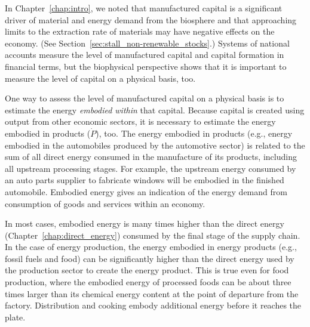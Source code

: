 

In Chapter~\ref{chap:intro}, we noted that 
manufactured capital is a significant driver 
of material and energy demand from the biosphere
and that approaching limits 
to the extraction rate of materials may have negative
effects on the economy.
(See Section~\ref{sec:stall_non-renewable_stocks}.)
Systems of national accounts measure the level
of manufactured capital and capital formation in financial terms,
but the biophysical perspective shows that
it is important to measure the level of capital 
on a physical basis, too.

One way to assess the level of manufactured capital on a physical basis
is to estimate the energy \emph{embodied within} that capital.
Because capital is created using output from other economic sectors, 
it is necessary to estimate the energy embodied in products ($\dot{P}$), too.
The energy embodied in products 
(e.g., energy embodied in the automobiles produced by the automotive sector)
is related to the sum of all direct energy
consumed in the manufacture of its products, 
including all upstream processing stages. 
For example, the upstream energy consumed by an auto parts supplier
to fabricate windows will be embodied in the finished automobile.
Embodied energy gives an indication 
of the energy demand from consumption of goods and services
within an economy.

In most cases, embodied energy is many times higher than the direct
energy (Chapter~\ref{chap:direct_energy}) consumed 
by the final stage of the supply chain.
In the case of energy production, 
the energy embodied in energy products (e.g., fossil fuels and food) 
can be significantly higher than the direct energy 
used by the production sector to create the energy product.
This is true even for food production,
where the embodied energy of processed foods
can be about three times larger than 
its chemical energy content at the point of departure from the factory.\cite{Hamilton:2013aa}
Distribution and cooking embody additional energy before it reaches the plate.

